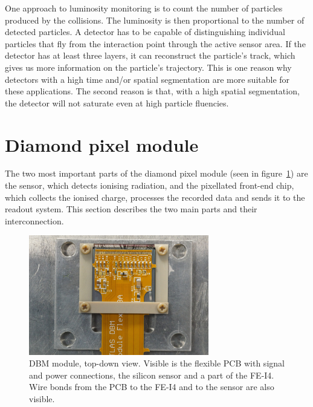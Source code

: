 \documentclass[12pt]{packages/mytustyle}  %
\begin{document}
One approach to luminosity monitoring is to count the number of particles produced by the collisions. The luminosity is then proportional to the number of detected particles. A detector has to be capable of distinguishing individual particles that fly from the interaction point through the active sensor area. If the detector has at least three layers, it can reconstruct the particle's track, which gives us more information on the particle's trajectory. This is one reason why detectors with a high time and/or spatial segmentation are more suitable for these applications. The second reason is that, with a high spatial segmentation, the detector will not saturate even at high particle fluencies.





\section{Diamond pixel module}
\label{sec:atlasdbm}
The two most important parts of the diamond pixel module (seen in figure~\ref{fig:dbmmodule}) are the sensor, which detects ionising radiation, and the pixellated front-end chip, which collects the ionised charge, processes the recorded data and sends it to the readout system. This section describes the two main parts and their interconnection.
\begin{figure}[!t]
\centering
\includegraphics[width=0.7\textwidth]{pics/mod1}
\caption{DBM module, top-down view. Visible is the flexible PCB with signal and power connections, the silicon sensor and a part of the FE-I4. Wire bonds from the PCB to the FE-I4 and to the sensor are also visible.}
\label{fig:dbmmodule}
\end{figure}
\end{document}
